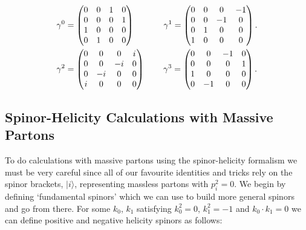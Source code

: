 	\begin{align}
	    \gamma^0 &= \begin{pmatrix}
	           0 & 0 & 1 & 0\\
	           0 & 0 & 0 & 1\\
	           1 & 0 & 0 & 0\\
	           0 & 1 & 0 & 0\\
	         \end{pmatrix}\hspace{1.2cm}
	    \gamma^1 = \begin{pmatrix}
	           0 & 0 & 0 & -1\\
	           0 & 0 & -1 & 0\\
	           0 & 1 & 0 & 0\\
	           1 & 0 & 0 & 0\\
	         \end{pmatrix}.\\
	    \gamma^2 &= \begin{pmatrix}
	           0 & 0 & 0 & i\\
	           0 & 0 & -i & 0\\
	           0 & -i & 0 & 0\\
	           i & 0 & 0 & 0\\
	         \end{pmatrix}\hspace{0.75cm}
	    \gamma^3 = \begin{pmatrix}
	           0 & 0 & -1 & 0\\
	           0 & 0 & 0 & 1\\
	           1 & 0 & 0 & 0\\
	           0 & -1 & 0 & 0\\
	         \end{pmatrix}.
	\end{align}

	\subsection{Spinor-Helicity Calculations with Massive Partons}
		\label{sub:SMMassive}

		To do calculations with massive partons using the spinor-helicity formalism we must be very careful since all of our favourite
		identities and tricks rely on the spinor brackets, $|i\rangle$, representing massless partons with $p_i^2=0$. We begin by
		defining `fundamental spinors' \cite{spinorThesis} which we can use to build more general spinors and go from there.
		For some $k_0$, $k_1$ satisfying $k_0^2=0$, $k_1^2=-1$ and $k_0\cdot k_1=0$ we can define positive and negative helicity spinors as follows:


